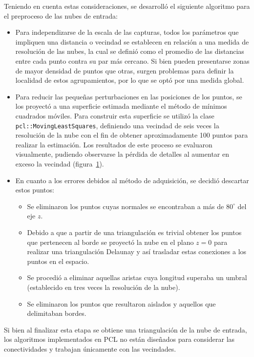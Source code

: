 Teniendo en cuenta estas consideraciones, se desarrolló el siguiente algoritmo
para el preproceso de las nubes de entrada:
\begin{itemize}
	\item Para independizarse de la escala de las capturas,
todos los parámetros que impliquen una distancia o vecindad
se establecen en relación a una medida de resolución de las nubes,
la cual se definió como el promedio de las distancias entre cada punto
contra su par más cercano.
Si bien pueden presentarse zonas de mayor densidad de puntos que otras,
surgen problemas para definir la localidad de estos agrupamientos,
por lo que se optó por una medida global.

\item Para reducir las pequeñas perturbaciones en las posiciones de los puntos,
se los proyectó a una superficie estimada mediante el método de mínimos cuadrados móviles.
Para construir esta superficie se utilizó la clase
\texttt{pcl::Moving\-Least\-Squares}, definiendo una vecindad de seis veces la
resolución de la nube con el fin de obtener aproximadamente 100 puntos para
realizar la estimación.
Los resultados de este proceso se evaluaron visualmente, pudiendo observarse la pérdida de detalles
al aumentar en exceso la vecindad (figura~\ref{fig:mls}). 
\begin{figure}
	\caption{\label{fig:mls}}
\end{figure}

\item En cuanto a los errores debidos al método de adquisición, se decidió descartar estos puntos:
	\begin{itemize}
		\item Se eliminaron los puntos cuyas normales se encontraban a más de $80^{\circ}$ del eje $z$.
		\item Debido a que a partir de una triangulación es trivial obtener los puntos que pertenecen al borde
se proyectó la nube en el plano $z=0$ para realizar una triangulación Delaunay y así
trasladar estas conexiones a los puntos en el espacio.
		\item Se procedió a eliminar aquellas aristas cuya longitud superaba un umbral (establecido en tres veces la resolución de la nube).
		\item Se eliminaron los puntos que resultaron aislados y aquellos que delimitaban bordes.
	\end{itemize}
\end{itemize}

Si bien al finalizar esta etapa se obtiene una triangulación de la nube de entrada,
los algoritmos implementados en PCL no están diseñados para considerar las conectividades y trabajan únicamente con las vecindades.
